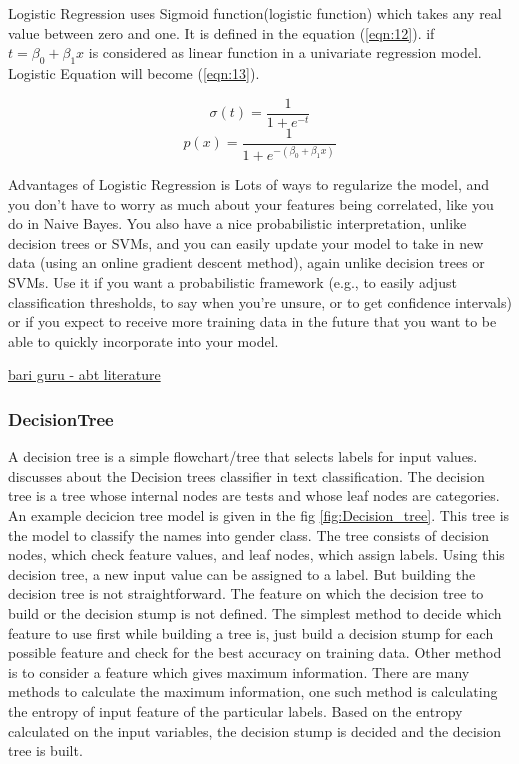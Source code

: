 Logistic Regression uses Sigmoid function(logistic function) which takes any real value between zero and one. It is defined in the equation (\ref{eqn:12}). if $t= \beta_0 + \beta_1x$ is considered as linear function in a univariate regression model. Logistic Equation will become (\ref{eqn:13}). 




\begin{equation}
\label{eqn:12}
\sigma(t) = \frac{1}{1+e^{-t}}
\end{equation}
\begin{equation}
\label{eqn:13}
p(x) = \frac{1}{1 + e^{-(\beta_0 + \beta_1x)}}
\end{equation}



Advantages of Logistic Regression is Lots of ways to regularize the model, and you don’t have to worry as much about your features being correlated, like you do in Naive Bayes. You also have a nice probabilistic interpretation, unlike decision trees or SVMs, and you can easily update your model to take in new data (using an online gradient descent method), again unlike decision trees or SVMs. Use it if you want a probabilistic framework (e.g., to easily adjust classification thresholds, to say when you’re unsure, or to get confidence intervals) or if you expect to receive more training data in the future that you want to be able to quickly incorporate into your model.

\underline{bari guru - abt literature }

\subsubsection{DecisionTree}
A decision tree is a simple flowchart/tree that selects labels for input values. \cite{BirdKleinLoper09} discusses about the Decision trees classifier in text classification. The decision tree is a tree whose internal nodes are tests and whose leaf nodes are categories. An example decicion tree model is given in the fig \ref{fig:Decision_tree}. This tree is the model to classify the names into gender class. The tree consists of decision nodes, which check feature values, and leaf nodes, which assign labels. Using this decision tree, a new input value can be assigned to a label. But building the decision tree is not straightforward. The feature on which the decision tree to build or the decision stump is not defined. The simplest method to decide which feature to use first while building a tree is, just build a decision stump for each possible feature and check for the best accuracy on training data. Other method is to consider a feature which gives maximum information. There are many methods to calculate the maximum information, one such method is calculating the entropy of input feature of the particular labels. Based on the entropy calculated on the input variables, the decision stump is decided and the decision tree is built.

